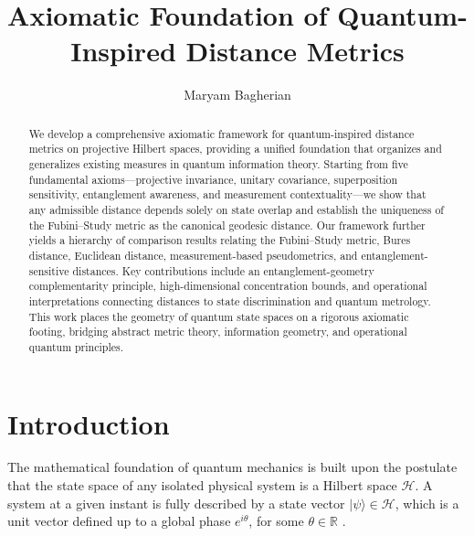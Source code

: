 \documentclass[aps,pra,reprint,nofootinbib,showpacs,superscriptaddress]{revtex4-1}
\newcommand{\Hilbert}{\mathcal{H}}
\begin{document}
\title{Axiomatic Foundation of Quantum-Inspired Distance Metrics}
\author{Maryam Bagherian}


\begin{abstract}
We develop a comprehensive axiomatic framework for quantum-inspired distance metrics on projective Hilbert spaces, providing a unified foundation that organizes and generalizes existing measures in quantum information theory. Starting from five fundamental axioms—projective invariance, unitary covariance, superposition sensitivity, entanglement awareness, and measurement contextuality—we show that any admissible distance depends solely on state overlap and establish the uniqueness of the Fubini–Study metric as the canonical geodesic distance. Our framework further yields a hierarchy of comparison results relating the Fubini–Study metric, Bures distance, Euclidean distance, measurement-based pseudometrics, and entanglement-sensitive distances. Key contributions include an entanglement-geometry complementarity principle, high-dimensional concentration bounds, and operational interpretations connecting distances to state discrimination and quantum metrology. This work places the geometry of quantum state spaces on a rigorous axiomatic footing, bridging abstract metric theory, information geometry, and operational quantum principles.
\end{abstract}
\maketitle

\section{Introduction}

The mathematical foundation of quantum mechanics is built upon the postulate that the state space of any isolated physical system is a Hilbert space $\Hilbert$. A system at a given instant is fully described by a {state vector} $|\psi\rangle \in \Hilbert$, which is a unit vector defined up to a global phase $e^{i\theta}$, for some $\theta \in \mathbb{R}$ \cite{nielsen2010quantum}.
\end{document}
